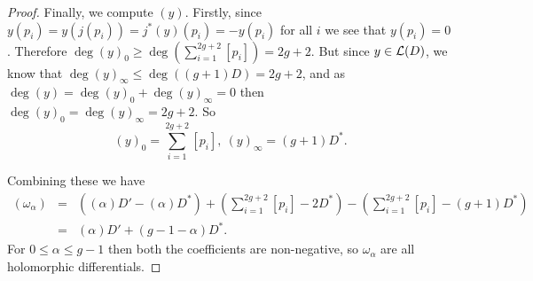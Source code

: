 \documentclass[11pt]{article} %
\theoremstyle{remark}
\newcommand{\cL}{{\cal L}}
\begin{document}
\begin{proof}
\begin{comment}
Finally, take some $p \notin \{p_1, \ldots, p_{2g+2},\infty\}$ and let $z$ be a local coordinate for $p$ with $z(p) = 0$.
Then if $x(p) = a$ we can write $x - a = zh(z)$ for some holomorphic function $h$ which does not vanish in a neighbourhood of $p$.
In that case $dx = h(z)$, and so the order of $dx$ at such a $p$ is zero.

Combining all of this gives 
\[
 (dx) = \sum_{i=1}^{2g+2} [p_i] - 2D^*.
\]
\end{comment}

Finally, we compute $(y)$.
Firstly, since $y(p_i)= y(j(p_i)) = j^*(y)(p_i)= -y(p_i)$ for all $i$ we see that $y(p_i)=0$.
Therefore $\deg(y)_0 \geq \deg\left(\sum_{i = 1}^{2g +2} [p_i] \right) = 2g+2$.
But since $y\in \cL(D)$, we know that $\deg(y)_{\infty} \leq \deg((g+1)D) = 2g + 2$, and as $\deg(y) = \deg(y)_0 + \deg(y)_{\infty} = 0$ then $\deg(y)_0 = \deg(y)_{\infty} = 2g+2$.
So
\[
 (y)_0 = \sum_{i=1}^{2g+2} [p_i], \ (y)_{\infty} = (g+1)D^*.
\]


Combining these we have 
\begin{eqnarray*}
 (\omega_{\alpha}) & = & ((\alpha )D' -(\alpha )D^*) + \left(\sum_{i=1}^{2g+2}[p_i] -2D^* \right) - \left(\sum_{i=1}^{2g+2} [p_i] - (g+1)D^* \right)\\
& = & (\alpha )D' + (g-1-\alpha)D^*.
\end{eqnarray*}
For $0\leq \alpha \leq g-1$ then both the coefficients are non-negative, so $\omega_{\alpha}$ are all holomorphic differentials.
\end{proof}




% 
% 
\end{document}
